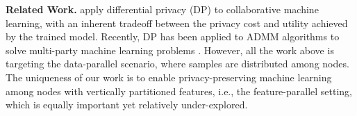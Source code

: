 
\textbf{Related Work.} \cite{pathak2010multiparty,rajkumar2012differentially} apply differential privacy (DP) to collaborative machine learning, with an inherent tradeoff between the privacy cost and utility achieved by the trained model. Recently, DP has been applied to ADMM algorithms to solve multi-party machine learning problems \cite{zhang2018improving,zhang2016dual,zhang2019admm,zhang2017dynamic}. 
However, all the work above is targeting the data-parallel scenario, where samples are distributed among nodes. The uniqueness of our work is to enable privacy-preserving machine learning among nodes with vertically partitioned features, i.e., the feature-parallel setting, which is equally important yet relatively under-explored. 



